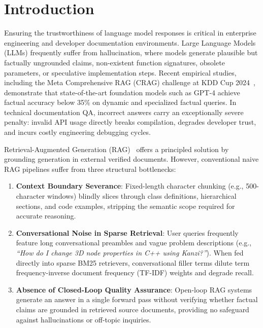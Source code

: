 \documentclass[sigconf,nonacm]{acmart}
\begin{document}


\maketitle

\section{Introduction}
Ensuring the trustworthiness of language model responses is critical in enterprise engineering and developer documentation environments. Large Language Models (LLMs) frequently suffer from hallucination, where models generate plausible but factually ungrounded claims, non-existent function signatures, obsolete parameters, or speculative implementation steps. Recent empirical studies, including the Meta Comprehensive RAG (CRAG) challenge at KDD Cup 2024~\cite{crag}, demonstrate that state-of-the-art foundation models such as GPT-4 achieve factual accuracy below 35\% on dynamic and specialized factual queries. In technical documentation QA, incorrect answers carry an exceptionally severe penalty: invalid API usage directly breaks compilation, degrades developer trust, and incurs costly engineering debugging cycles.

Retrieval-Augmented Generation (RAG)~\cite{rag_lewis,rag_survey} offers a principled solution by grounding generation in external verified documents. However, conventional naive RAG pipelines suffer from three structural bottlenecks:
\begin{enumerate}
    \item \textbf{Context Boundary Severance}: Fixed-length character chunking (e.g., 500-character windows) blindly slices through class definitions, hierarchical sections, and code examples, stripping the semantic scope required for accurate reasoning.
    \item \textbf{Conversational Noise in Sparse Retrieval}: User queries frequently feature long conversational preambles and vague problem descriptions (e.g., \emph{``How do I change 3D node properties in C++ using Kanzi?''}). When fed directly into sparse BM25 retrievers, conversational filler terms dilute term frequency-inverse document frequency (TF-IDF) weights and degrade recall.
    \item \textbf{Absence of Closed-Loop Quality Assurance}: Open-loop RAG systems generate an answer in a single forward pass without verifying whether factual claims are grounded in retrieved source documents, providing no safeguard against hallucinations or off-topic inquiries.
\end{enumerate}
\end{document}
